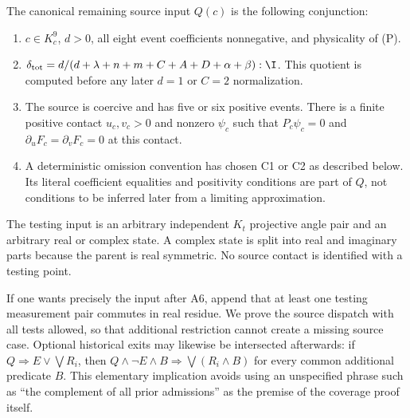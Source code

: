 The canonical remaining source input $Q(c)$ is the following conjunction:
\begin{enumerate}
\item $c\in K_c^9$, $d>0$, all eight event coefficients nonnegative,
and physicality of (P).
\item $\delta_{\rm tot}=d/(d+\lambda+n+m+C+A+D+\alpha+\beta):\I$.
This quotient is computed before any later $d=1$ or $C=2$ normalization.
\item The source is coercive and has five or six positive events.
There is a finite positive contact $u_c,v_c>0$ and nonzero $\psi_c$
such that $P_c\psi_c=0$ and
$\partial_u F_c=\partial_v F_c=0$ at this contact.
\item A deterministic omission convention has chosen C1 or C2 as
described below. Its literal coefficient equalities and positivity
conditions are part of $Q$, not conditions to be inferred later from
a limiting approximation.
\end{enumerate}
The testing input is an arbitrary independent $K_t$ projective angle
pair and an arbitrary real or complex state. A complex state is split
into real and imaginary parts because the parent is real symmetric.
No source contact is identified with a testing point.

If one wants precisely the input after A6, append that at least one
testing measurement pair commutes in real residue. We prove the source
dispatch with all tests allowed, so that additional restriction cannot
create a missing source case. Optional historical exits may likewise be
intersected afterwards: if $Q\Rightarrow E\lor\bigvee R_i$, then
$Q\land\neg E\land B\Rightarrow\bigvee(R_i\land B)$ for every
common additional predicate $B$. This elementary implication avoids
using an unspecified phrase such as ``the complement of all prior
admissions'' as the premise of the coverage proof itself.

